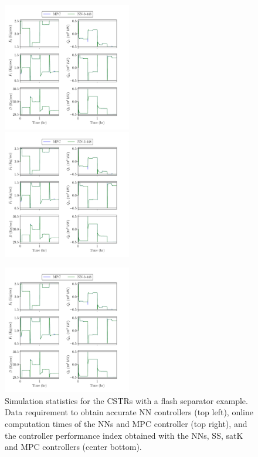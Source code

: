 \documentclass[preprint,5p, twocolumn, authoryear]{elsarticle}
\begin{document}
\begin{figure}[!h]
    \includegraphics[page=31, width=0.5\textwidth,
        height=0.28\textheight]{cstrs_comparision_plots.pdf} \hfill
        \includegraphics[page=34, width=0.5\textwidth,
        height=0.28\textheight]{cstrs_comparision_plots.pdf} \vfill
    \vspace{-0.1in}
    \begin{center}\includegraphics[page=33, width=0.5\textwidth,
        height=0.28\textheight]{cstrs_comparision_plots.pdf}
    \end{center}
    \vspace{-0.2in}
    \caption{Simulation statistics for the  
    CSTRs with a flash separator example. Data requirement to obtain accurate NN
    controllers (top left), online computation times of the NNs and MPC
    controller (top right), and the controller performance index obtained with
    the NNs, SS, satK and MPC controllers (center bottom).}	
    \label{fig:cstrs_statistics}
\end{figure}
\end{document}
